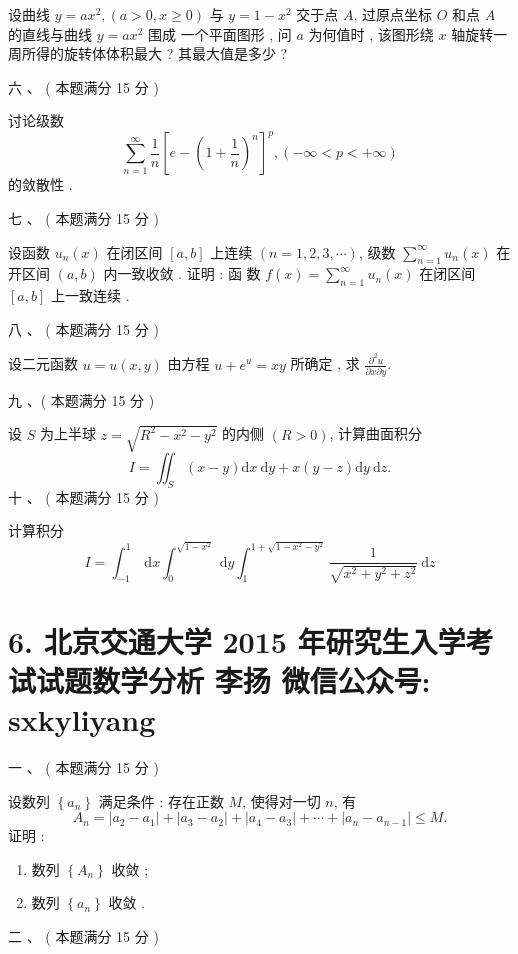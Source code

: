 \documentclass[10pt]{article}
\begin{document}
{ 设曲线  $y=a x^{2},(a>0, x \geqslant 0)$  与  $y=1-x^{2}$  交于点  $A$,  过原点坐标  $O$  和点  $A$  的直线与曲线  $y=a x^{2}$  围成   一个平面图形 ,  问  $a$  为何值时 ,  该图形绕  $x$  轴旋转一周所得的旋转体体积最大 ?  其最大值是多少 ?

 六 、 ( 本题满分  15  分 )

 讨论级数 
$$
\sum_{n=1}^{\infty} \frac{1}{n}\left[e-\left(1+\frac{1}{n}\right)^{n}\right]^{p},(-\infty<p<+\infty)
$$
 的敛散性 .

 七 、 ( 本题满分  15  分 )

 设函数  $u_{n}(x)$  在闭区间  $[a, b]$  上连续  $(n=1,2,3, \cdots)$,  级数  $\sum_{n=1}^{\infty} u_{n}(x)$  在开区间  $(a, b)$  内一致收敛 .  证明 :  函   数  $f(x)=\sum_{n=1}^{\infty} u_{n}(x)$  在闭区间  $[a, b]$  上一致连续 .

 八 、 ( 本题满分  15  分 )

 设二元函数  $u=u(x, y)$  由方程  $u+e^{u}=x y$  所确定 ,  求  $\frac{\partial^{2} u}{\partial x \partial y}$.

 九 、( 本题满分  15  分 )

 设  $S$  为上半球  $z=\sqrt{R^{2}-x^{2}-y^{2}}$  的内侧  $(R>0)$,  计算曲面积分 
$$
I=\iint_{S}(x-y) \mathrm{d} x \mathrm{~d} y+x(y-z) \mathrm{d} y \mathrm{~d} z .
$$
 十 、 ( 本题满分  15  分 )

 计算积分 
$$
I=\int_{-1}^{1} \mathrm{~d} x \int_{0}^{\sqrt{1-x^{2}}} \mathrm{~d} y \int_{1}^{1+\sqrt{1-x^{2}-y^{2}}} \frac{1}{\sqrt{x^{2}+y^{2}+z^{2}}} \mathrm{~d} z
$$

\section{6. 北京交通大学 2015 年研究生入学考试试题数学分析 
 李扬 
 微信公众号: sxkyliyang}
 一 、 ( 本题满分  15  分 )

 设数列  $\left\{a_{n}\right\}$  满足条件 :  存在正数  $M$,  使得对一切  $n$,  有 
$$
A_{n}=\left|a_{2}-a_{1}\right|+\left|a_{3}-a_{2}\right|+\left|a_{4}-a_{3}\right|+\cdots+\left|a_{n}-a_{n-1}\right| \leqslant M .
$$
 证明 :

\begin{enumerate}
  \item  数列  $\left\{A_{n}\right\}$  收敛 ;

  \item  数列  $\left\{a_{n}\right\}$  收敛 .

\end{enumerate}
 二 、 ( 本题满分  15  分 )

}
\end{document}
